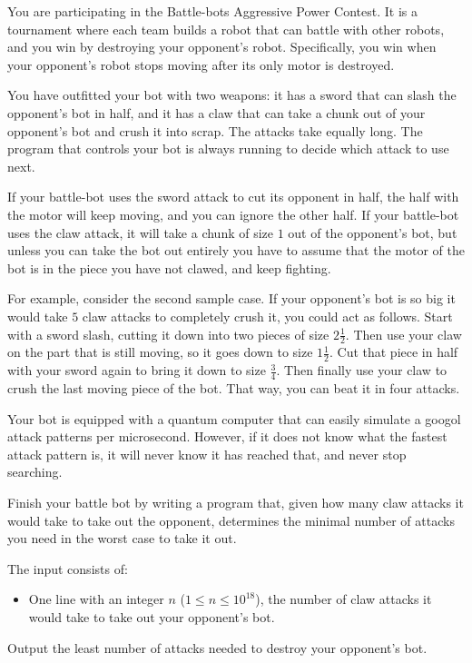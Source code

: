 

\newcommand{\maxn}{10^{18}}

You are participating in the Battle-bots Aggressive Power Contest. It is a tournament where
each team builds a robot that can battle with other robots, and you win by destroying your
opponent's robot. Specifically, you win when your opponent's robot stops moving
after its only motor is destroyed.

You have outfitted your bot with two weapons: it has a sword that can slash the opponent's bot in
half, and it has a claw that can take a chunk out of your opponent's bot and crush it into
scrap. The attacks take equally long. The program that controls your bot is always running to
decide which attack to use next.

If your battle-bot uses the sword attack to cut its opponent in half, the half
with the motor will keep moving, and you can ignore the other half. If your
battle-bot uses the claw attack, it will take a chunk of size $1$ out of the opponent's bot,
but unless you can take the bot out entirely you have to assume that the motor
of the bot is in the piece you have not clawed, and keep fighting.

For example, consider the second sample case.
If your opponent's bot is so big it would take $5$ claw attacks to completely crush
it, you could act as follows. Start with a sword slash, cutting it down into two pieces of size
$2\frac12$. Then use your claw on the part that is still moving, so it goes down to size $1\frac12$. Cut that
piece in half with your sword again to bring it down to size $\frac34$. Then finally use your claw to
crush the last moving piece of the bot. That way, you can beat it in four attacks.

Your bot is equipped with a quantum computer that can easily simulate a googol attack patterns
per microsecond. However, if it does not know what the fastest attack pattern is, it will never
know it has reached that, and never stop searching.

Finish your battle bot by writing a program that, given how many claw attacks it would take to
take out the opponent, determines the minimal number of attacks you need in the
worst case to take it out.

\begin{Input}
    The input consists of:
    \begin{itemize}
        \item One line with an integer $n$ ($1\leq n\leq \maxn$), the number of claw attacks it
            would take to take out your opponent's bot.
    \end{itemize}
\end{Input}

\begin{Output}
    Output the least number of attacks needed to destroy your opponent's bot.
\end{Output}
